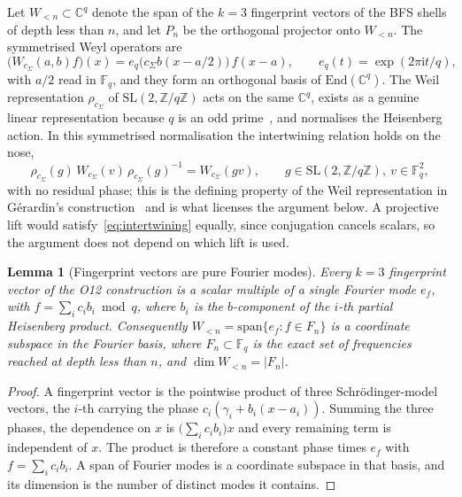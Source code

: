 \documentclass[11pt,a4paper]{article}
\newtheorem{lemma}[theorem]{Lemma}
\newcommand{\SL}{\mathrm{SL}}
\begin{document}
    Let $W_{<n} \subset \mathbb{C}^{q}$ denote the span of the $k = 3$ fingerprint vectors of
    the BFS shells of depth less than $n$, and let $P_{n}$ be the orthogonal projector onto
    $W_{<n}$.
    The symmetrised Weyl operators are
    \[
      \big(W_{c_{\Sigma}}(a,b) f\big)(x)
      = e_{q}\!\big(c_{\Sigma} b (x - a/2)\big)\, f(x-a),
      \qquad e_{q}(t) = \exp(2\pi \mathrm{i} t / q),
    \]
    with $a/2$ read in $\mathbb{F}_{q}$, and they form an orthogonal basis of
    $\mathrm{End}(\mathbb{C}^{q})$.
    The Weil representation $\rho_{c_{\Sigma}}$ of $\SL(2,\mathbb{Z}/q\mathbb{Z})$ acts on the
    same $\mathbb{C}^{q}$, exists as a genuine linear representation because $q$ is an odd
    prime~\cite{Weil1964,Gerardin1977}, and normalises the Heisenberg action.
    In this symmetrised normalisation the intertwining relation holds on the nose,
    \begin{equation}
      \label{eq:intertwining}
      \rho_{c_{\Sigma}}(g)\, W_{c_{\Sigma}}(v)\, \rho_{c_{\Sigma}}(g)^{-1}
      = W_{c_{\Sigma}}(gv),
      \qquad g \in \SL(2,\mathbb{Z}/q\mathbb{Z}),\ v \in \mathbb{F}_{q}^{2},
    \end{equation}
    with no residual phase; this is the defining property of the Weil representation in
    Gérardin's construction~\cite[\S1--2]{Gerardin1977} and is what licenses the argument
    below.
    A projective lift would satisfy~\eqref{eq:intertwining} equally, since conjugation cancels
    scalars, so the argument does not depend on which lift is used.

    \begin{lemma}[Fingerprint vectors are pure Fourier modes]
      \label{lem:pure-fourier}
      Every $k = 3$ fingerprint vector of the O12 construction is a scalar multiple of a single
      Fourier mode $e_{f}$, with $f = \sum_{i} c_{i} b_{i} \bmod q$, where $b_{i}$ is the
      $b$-component of the $i$-th partial Heisenberg product.
      Consequently $W_{<n} = \mathrm{span}\{ e_{f} : f \in F_{n} \}$ is a coordinate subspace in
      the Fourier basis, where $F_{n} \subset \mathbb{F}_{q}$ is the exact set of frequencies
      reached at depth less than $n$, and $\dim W_{<n} = |F_{n}|$.
    \end{lemma}

    \begin{proof}
      A fingerprint vector is the pointwise product of three Schr\"{o}dinger-model vectors, the
      $i$-th carrying the phase $c_{i}(\gamma_{i} + b_{i}(x - a_{i}))$.
      Summing the three phases, the dependence on $x$ is $\big(\sum_{i} c_{i} b_{i}\big) x$ and
      every remaining term is independent of $x$.
      The product is therefore a constant phase times $e_{f}$ with $f = \sum_{i} c_{i} b_{i}$.
      A span of Fourier modes is a coordinate subspace in that basis, and its dimension is the
      number of distinct modes it contains.
    \end{proof}
\end{document}
